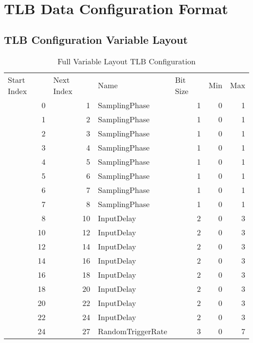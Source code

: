 \chapter{TLB Data Configuration Format}
\label{TLBDataFormat}

\section{TLB Configuration Variable Layout}
\begin{table}[htbp]
  \centering
  \caption{Full Variable Layout TLB Configuration}
    \begin{tabular}{rrlrrr}
    \multicolumn{1}{l}{Start Index} & \multicolumn{1}{l}{Next Index} & Name  & \multicolumn{1}{l}{Bit Size} & \multicolumn{1}{l}{Min} & \multicolumn{1}{l}{Max} \\
    0     & 1     & SamplingPhase & 1     & 0     & 1 \\
    1     & 2     & SamplingPhase & 1     & 0     & 1 \\
    2     & 3     & SamplingPhase & 1     & 0     & 1 \\
    3     & 4     & SamplingPhase & 1     & 0     & 1 \\
    4     & 5     & SamplingPhase & 1     & 0     & 1 \\
    5     & 6     & SamplingPhase & 1     & 0     & 1 \\
    6     & 7     & SamplingPhase & 1     & 0     & 1 \\
    7     & 8     & SamplingPhase & 1     & 0     & 1 \\
    8     & 10    & InputDelay & 2     & 0     & 3 \\
    10    & 12    & InputDelay & 2     & 0     & 3 \\
    12    & 14    & InputDelay & 2     & 0     & 3 \\
    14    & 16    & InputDelay & 2     & 0     & 3 \\
    16    & 18    & InputDelay & 2     & 0     & 3 \\
    18    & 20    & InputDelay & 2     & 0     & 3 \\
    20    & 22    & InputDelay & 2     & 0     & 3 \\
    22    & 24    & InputDelay & 2     & 0     & 3 \\
    24    & 27    & RandomTriggerRate & 3     & 0     & 7 \\

\end{tabular}
\end{table}
